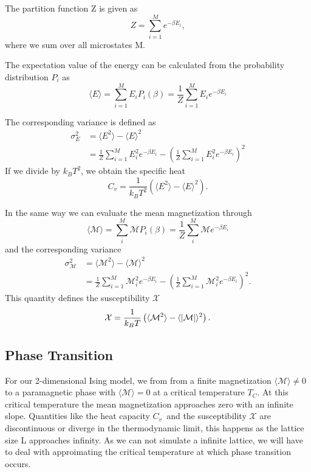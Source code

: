 \documentclass[%
reprint,
nofootinbib,
amsmath,amssymb,
aps,
]{revtex4-1}
\begin{document}
The partition function Z is given as 
\begin{equation}\label{eq:Z}
	Z = \sum_{i=1}^{M}e^{-\beta E_i},
\end{equation} 
where we sum over all microstates M.

The expectation value of the energy can be calculated from the probability distribution $P_i$ as 
\begin{equation}\label{eq:E}
	\langle E\rangle = \sum_{i=1}^{M}E_iP_i(\beta) = \frac{1}{Z}\sum_{i=1}^ME_ie^{-\beta E_i}
\end{equation}

The corresponding variance is defined as 
\begin{equation}
	\begin{split}
\sigma_E^2 &= \langle E^2 \rangle -\langle E\rangle^2 \\
&= \frac{1}{Z}\sum_{i=1}^ME_i^2e^{-\beta E_i} - \left(\frac{1}{Z}\sum_{i=1}^ME_i^2e^{-\beta E_i}\right)^2
	\end{split}
\end{equation}
If we divide by $k_BT^2$, we obtain the specific heat 
\begin{equation}\label{eq:cv}
	C_v = \frac{1}{k_BT^2}\left(\langle E^2 \rangle -\langle E\rangle^2\right).
\end{equation}

In the same way we can evaluate the mean magnetization through 
\begin{equation}\label{eq:M}
	\langle\mathcal{M}\rangle = \sum_i^M\mathcal{M}P_i(\beta) = \frac{1}{Z}\sum_i^M\mathcal{M}e^{-\beta E_i}
\end{equation}
and the corresponding variance 
\begin{equation}
\begin{split} 
		\sigma_\mathcal{M}^2			&=\langle \mathcal{M}^2 \rangle -\langle \mathcal{M}\rangle^2 \\
			&= \frac{1}{Z}\sum_{i=1}^M\mathcal{M}_i^2e^{-\beta E_i} - \left(\frac{1}{Z}\sum_{i=1}^M\mathcal{M}_i^2e^{-\beta E_i}\right)^2.
		\end{split} 
\end{equation}
This quantity defines the susceptibility $\mathcal{X}$
\begin{equation}\label{eq:x}
	\mathcal{X} = \frac{1}{k_BT}\left(\langle \mathcal{M}^2 \rangle -\langle \abs{\mathcal{M}}\rangle^2\right).
\end{equation}
\subsection{Phase Transition} %
For our 2-dimensional Ising model, we from from a finite magnetization $\langle \mathcal{M} \rangle \neq 0$ to a paramagnetic phase with $\langle \mathcal{M} \rangle = 0$ at a critical temperature $T_C$. At this critical temperature the mean magnetization approaches zero with an infinite slope. Quantities like the heat capacity $C_v$ and the susceptibility $\mathcal{X}$ are discontinuous or diverge in the thermodynamic limit\cite{morten}, this happens as the lattice size L approaches infinity. As we can not simulate a infinite lattice, we will have to deal with approimating the critical temperature at which phase transition occurs. 
\end{document}
